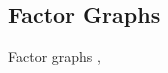 \documentclass[letterpaper]{article} %
\theoremstyle{plain}
\theoremstyle{definition}
\theoremstyle{remark}
\begin{document}
\subsection{Factor Graphs} 
\label{sec:factor-graphs}
Factor graphs 
\cite{kschischang2001sumproduct},
\end{document}
